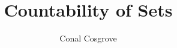 \documentclass[10pt,a4paper,openbib]{report}
\author{Conal Cosgrove}
\begin{document}
\title{Countability of Sets}
\end{document}
